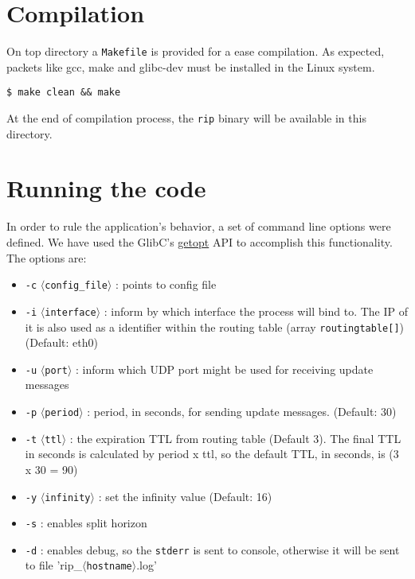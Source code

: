 \documentclass[10pt]{extarticle}
\newcommand{\abracket}[1]{$\langle$\texttt{#1}$\rangle$}
\begin{document}
\section{Compilation}

On top directory a \texttt{Makefile} is provided for a ease compilation. As
expected, packets like gcc, make and glibc-dev must be installed in the Linux
system.

\begin{Verbatim}
$ make clean && make
\end{Verbatim}

At the end of compilation process, the \texttt{rip} binary will be available in
this directory.

\section{Running the code}

In order to rule the application's behavior,  a set of command line options were
defined.          We           have          used           the          GlibC's
\href{http://www.gnu.org/software/libc/manual/html_node/Getopt.html}{getopt} API
to accomplish this functionality. The options are:

\begin{itemize}
\item{\texttt{-c}} \abracket{config\_file} : points to config file
\item{\texttt{-i}} \abracket{interface} : inform  by which interface the process
will bind to. The IP of it is also used as a identifier within the routing table
(array \texttt{routingtable[]}) (Default: eth0)
\item{\texttt{-u}} \abracket{port} : inform  which UDP port  might be  used for
receiving update messages
\item{\texttt{-p}} \abracket{period} : period,  in seconds, for  sending update
messages. (Default: 30)
\item{\texttt{-t}}  \abracket{ttl} :  the  expiration TTL  from  routing  table
(Default 3).  The final TTL  in seconds  is calculated by  period x ttl,  so the
default TTL, in seconds, is (3 x 30 = 90)
\item{\texttt{-y}}  \abracket{infinity} : set the infinity value (Default: 16)
\item{\texttt{-s}} : enables split horizon
\item{\texttt{-d}} : enables  debug, so the \texttt{stderr} is  sent to console,
otherwise it will be sent to file 'rip\_\abracket{hostname}.log'
\end{itemize}
\end{document}
